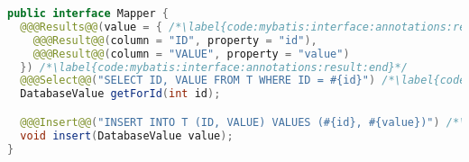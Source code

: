
\begin{lstlisting}[language=Java, caption={Definition of Mapper interface using annotations}, label={code:mybatis:interface:annotations}]
public interface Mapper {
  @@@Results@@(value = { /*\label{code:mybatis:interface:annotations:result:begin}*/
    @@@Result@@(column = "ID", property = "id"),
    @@@Result@@(column = "VALUE", property = "value")
  }) /*\label{code:mybatis:interface:annotations:result:end}*/
  @@@Select@@("SELECT ID, VALUE FROM T WHERE ID = #{id}") /*\label{code:mybatis:interface:annotations:query}*/
  DatabaseValue getForId(int id);

  @@@Insert@@("INSERT INTO T (ID, VALUE) VALUES (#{id}, #{value})") /*\label{code:mybatis:interface:annotations:insert}*/
  void insert(DatabaseValue value);
}
\end{lstlisting}
